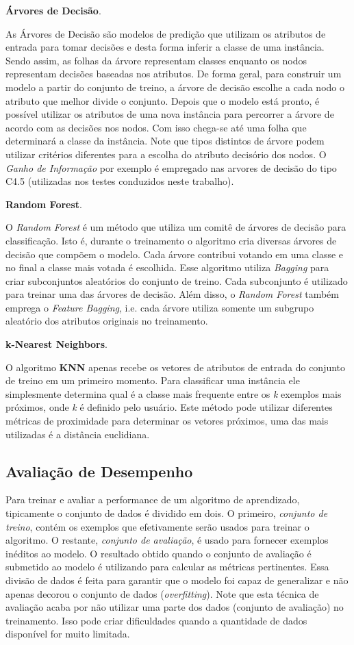 \textbf{Árvores de Decisão}.

As Árvores de Decisão são modelos de predição que utilizam os atributos de entrada para tomar decisões e desta forma inferir a classe de uma instância.
Sendo assim, as folhas da árvore representam classes enquanto os nodos representam decisões baseadas nos atributos.
De forma geral, para construir um modelo a partir do conjunto de treino, a árvore de decisão escolhe a cada nodo o atributo que melhor divide o conjunto.
Depois que o modelo está pronto, é possível utilizar os atributos de uma nova instância para percorrer a árvore de acordo com as decisões nos nodos.
Com isso chega-se até uma folha que determinará a classe da instância.
Note que tipos distintos de árvore podem utilizar critérios diferentes para a escolha do atributo decisório dos nodos.
O \textit{ Ganho de Informação} por exemplo é empregado nas arvores de decisão do tipo C4.5 (utilizadas nos testes conduzidos neste trabalho).

\textbf{Random Forest}.

O \textit{Random Forest} é um método que utiliza um comitê de árvores de decisão para classificação.
Isto é, durante o treinamento o algoritmo cria diversas árvores de decisão que compõem o modelo.
Cada árvore contribui votando em uma classe e no final a classe mais votada é escolhida.
Esse algoritmo utiliza \textit{Bagging} para criar subconjuntos aleatórios do conjunto de treino.
Cada subconjunto é utilizado para treinar uma das árvores de decisão.
Além disso, o \textit{Random Forest} também emprega o \textit{Feature Bagging}, i.e. cada árvore utiliza somente um subgrupo aleatório dos atributos originais no treinamento.


\textbf{k-Nearest Neighbors}.

O algoritmo \textbf{KNN} apenas recebe os vetores de atributos de entrada do conjunto de treino em um primeiro momento.
Para classificar uma instância ele simplesmente determina qual é a classe mais frequente entre os \textit{k} exemplos mais próximos, onde \textit{k} é definido pelo usuário.
Este método pode utilizar diferentes métricas de proximidade para determinar os vetores próximos, uma das mais utilizadas é a distância euclidiana.

\subsection{Avaliação de Desempenho}

Para treinar e avaliar a performance de um algoritmo de aprendizado, tipicamente o conjunto de dados é dividido em dois.
O primeiro, \textit{conjunto de treino}, contém os exemplos que efetivamente serão usados para treinar o algoritmo.
O restante, \textit{conjunto de avaliação}, é usado para fornecer exemplos inéditos ao modelo.
O resultado obtido quando o conjunto de avaliação é submetido ao modelo é utilizando para calcular as métricas pertinentes.
Essa divisão de dados é feita para garantir que o modelo foi capaz de generalizar e não apenas decorou o conjunto de dados (\textit{overfitting}).
Note que esta técnica de avaliação acaba por não utilizar uma parte dos dados (conjunto de avaliação) no treinamento.
Isso pode criar dificuldades quando a quantidade de dados disponível for muito limitada.

